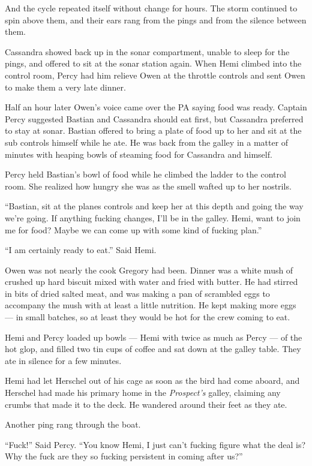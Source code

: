 \documentclass[
]{scrbook}
\begin{document}
And the cycle repeated itself without change for hours. The storm
continued to spin above them, and their ears rang from the pings and
from the silence between them.

Cassandra showed back up in the sonar compartment, unable to sleep for
the pings, and offered to sit at the sonar station again. When Hemi
climbed into the control room, Percy had him relieve Owen at the
throttle controls and sent Owen to make them a very late dinner.

Half an hour later Owen's voice came over the PA saying food was ready.
Captain Percy suggested Bastian and Cassandra should eat first, but
Cassandra preferred to stay at sonar. Bastian offered to bring a plate
of food up to her and sit at the sub controls himself while he ate. He
was back from the galley in a matter of minutes with heaping bowls of
steaming food for Cassandra and himself.

Percy held Bastian's bowl of food while he climbed the ladder to the
control room. She realized how hungry she was as the smell wafted up to
her nostrils.

``Bastian, sit at the planes controls and keep her at this depth and
going the way we're going. If anything fucking changes, I'll be in the
galley. Hemi, want to join me for food? Maybe we can come up with some
kind of fucking plan.''

``I am certainly ready to eat.'' Said Hemi.

Owen was not nearly the cook Gregory had been. Dinner was a white mush
of crushed up hard biscuit mixed with water and fried with butter. He
had stirred in bits of dried salted meat, and was making a pan of
scrambled eggs to accompany the mush with at least a little nutrition.
He kept making more eggs --- in small batches, so at least they would be
hot for the crew coming to eat.

Hemi and Percy loaded up bowls --- Hemi with twice as much as Percy ---
of the hot glop, and filled two tin cups of coffee and sat down at the
galley table. They ate in silence for a few minutes.

Hemi had let Herschel out of his cage as soon as the bird had come
aboard, and Herschel had made his primary home in the \emph{Prospect's}
galley, claiming any crumbs that made it to the deck. He wandered around
their feet as they ate.

Another ping rang through the boat.

``Fuck!'' Said Percy. ``You know Hemi, I just can't fucking figure what
the deal is? Why the fuck are they so fucking persistent in coming after
us?''
\end{document}
